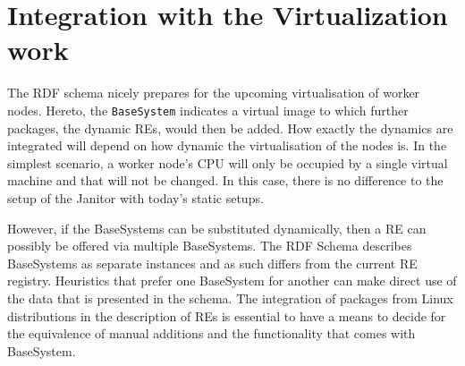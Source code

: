 \section{Integration with the Virtualization work}

The RDF schema nicely prepares for the upcoming virtualisation of worker
nodes. Hereto, the {\tt BaseSystem} indicates a virtual image to which
further packages, the dynamic REs, would then be added.
How exactly the dynamics are integrated will depend on how
dynamic the virtualisation of the nodes is. In the simplest scenario,
a worker node's CPU will only be occupied by a single virtual machine
and that will not be changed. In this case, there is no difference to
the setup of the Janitor with today's static setups.

However, if the BaseSystems can be substituted dynamically, then a RE
can possibly be offered via multiple BaseSystems. The RDF
Schema describes BaseSystems as separate instances and as such differs
from the current RE registry.  Heuristics that prefer one BaseSystem for
another can make direct use of the data that is presented in the schema.
The integration of packages from Linux distributions in the description
of REs is essential to have a means to decide for the equivalence of
manual additions and the functionality that comes with BaseSystem.








